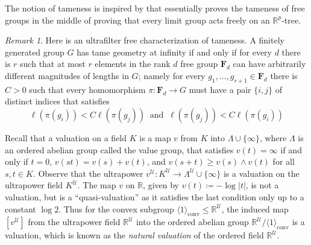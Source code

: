 \documentclass[12pt,nosumlimits,nonamelimits]{amsart}
\theoremstyle{remark}
\newtheorem{rem}[thm]{Remark}
\theoremstyle{definition}
\newcommand{\IR}{\mathbb{R}}
\newcommand{\bF}{\mathbf{F}}
\newcommand{\cU}{\mathcal{U}}
\newcommand{\La}{\Lambda}
\DeclareMathOperator{\conv}{conv}
\newcommand{\ip}[1]{\mathopen{\langle}#1\mathclose{\rangle}}
\begin{document}
The notion of tameness is inspired by \cite{guirardel} 
that essentially proves 
the tameness of free groups in the middle of proving 
that every limit group acts freely on an $\IR^p$-tree. 
%
\begin{rem}
Here is an ultrafilter free characterization of tameness. 
A finitely generated group $G$ has tame geometry at infinity 
if and only if for every $d$ there is $r$ such that at most $r$ 
elements in the rank $d$ free group $\bF_d$ can have 
arbitrarily different magnitudes of lengths in $G$; 
namely for every 
$g_1,\ldots,g_{r+1}\in\bF_d$ there is $C>0$ such that 
every homomorphism $\pi\colon\bF_d\to G$ must have 
a pair $\{ i,j\}$ of distinct indices that satisfies
\[
\ell(\pi(g_i)) < C \ell(\pi(g_j))
\ \mbox{ and }\ 
\ell(\pi(g_j)) < C \ell(\pi(g_i))
\]
\end{rem}
%

Recall that a valuation on a field $K$ is a map $v$ 
from $K$ into $\La\cup\{\infty\}$, where $\La$ is 
an ordered abelian group called the value group, 
that satisfies $v(t)=\infty$ if and only if $t=0$, 
$v(st) = v(s)+v(t)$, and $v(s+t) \geq v(s)\wedge v(t)$ 
for all $s,t\in K$.  
Observe that the ultrapower 
$v^\cU\colon K^\cU\to\La^\cU\cup\{\infty\}$ 
is a valuation on the ultrapower field $K^\cU$. 
The map $v$ on $\IR$, given by $v(t) \coloneq -\log |t|$, 
is not a valuation, but is a ``quasi-valuation'' as 
it satisfies the last condition only up to 
a constant $\log 2$. 
Thus for the convex subgroup 
$\ip{1}_{\conv} \le \IR^\cU$, 
the induced map $[v^\cU]$ from the ultrapower 
field $\IR^\cU$ into the ordered abelian group 
$\IR^\cU/\ip{1}_{\conv}$ is a valuation, 
which is known as the \emph{natural valuation} of 
the ordered field $\IR^\cU$.
\end{document}
